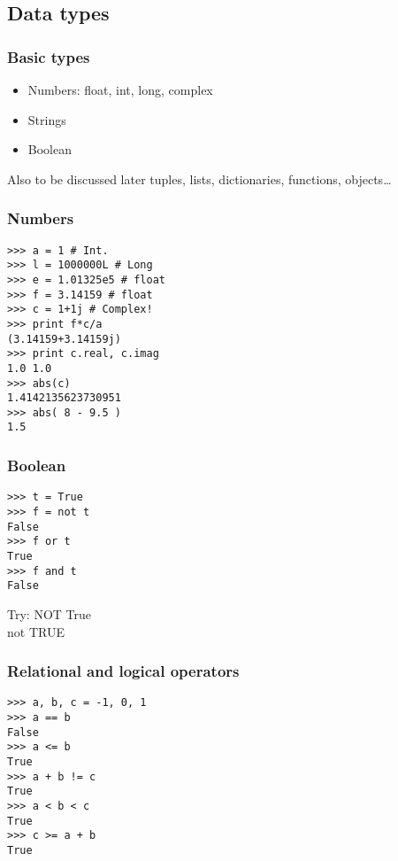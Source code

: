 \documentclass[14pt,compress]{beamer}
\begin{document}

\subsection{Data types}
\begin{frame}
  \frametitle{Basic types}
  \begin{itemize}
    \item Numbers: float, int, long, complex
    \item Strings
    \item Boolean
  \end{itemize}
  \begin{block}{Also to be discussed later}
    tuples, lists, dictionaries, functions, objects\ldots
  \end{block}
\end{frame}

\begin{frame}[fragile]
  \frametitle{Numbers}
  \vspace*{-0.25in}
  \begin{lstlisting}
>>> a = 1 # Int.
>>> l = 1000000L # Long
>>> e = 1.01325e5 # float
>>> f = 3.14159 # float
>>> c = 1+1j # Complex!
>>> print f*c/a
(3.14159+3.14159j)
>>> print c.real, c.imag
1.0 1.0
>>> abs(c)
1.4142135623730951
>>> abs( 8 - 9.5 )
1.5
  \end{lstlisting}
\end{frame}

\begin{frame}[fragile]
  \frametitle{Boolean}
  \begin{lstlisting}
>>> t = True
>>> f = not t
False
>>> f or t
True
>>> f and t
False
  \end{lstlisting}
  \begin{block}{Try:}
  NOT True\\
  not TRUE
  \end{block}
\end{frame}


\begin{frame}[fragile]
  \frametitle{Relational and logical operators}
  \begin{lstlisting}
>>> a, b, c = -1, 0, 1
>>> a == b
False
>>> a <= b 
True
>>> a + b != c
True
>>> a < b < c
True
>>> c >= a + b
True
  \end{lstlisting}
\end{frame}
\end{document}
